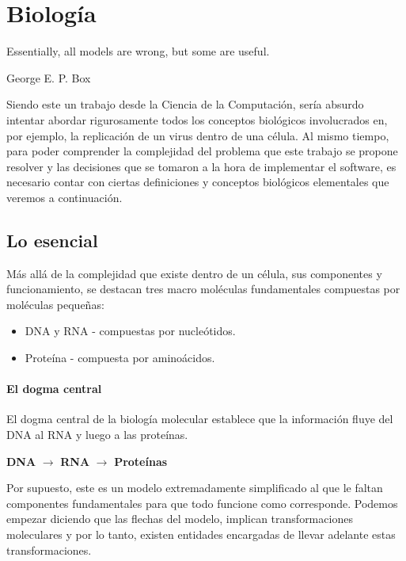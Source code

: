 \chapter{Biolog\'ia}
\label{biologia}
\epigraph{Essentially, all models are wrong, but some are useful.}%
{George E. P. Box}

Siendo este un trabajo desde la Ciencia de la Computaci\'on, ser\'ia absurdo
intentar abordar rigurosamente todos los conceptos biol\'ogicos involucrados
en, por ejemplo, la replicaci\'on de un virus dentro de una c\'elula. Al mismo
tiempo, para poder comprender la complejidad del problema que este trabajo se
propone resolver y las decisiones que se tomaron a la hora de implementar el
software, es necesario contar con ciertas definiciones y conceptos biol\'ogicos
elementales que veremos a continuaci\'on.

\section{Lo esencial}
\label{bio-esencial}

M\'as all\'a de la complejidad que existe dentro de un c\'elula, sus componentes
y funcionamiento, se destacan tres macro mol\'eculas fundamentales compuestas
por mol\'eculas peque\~nas:
\begin{itemize}
 \item \ac{DNA} y \ac{RNA} - compuestas por nucle\'otidos. 
 \item Prote\'ina - compuesta por amino\'acidos.
\end{itemize}

\subsubsection{El dogma central}

El dogma central de la biolog\'ia molecular establece que la informaci\'on
fluye del \ac{DNA} al \ac{RNA} y luego a las prote\'inas.
\begin{center}
 \textbf{DNA} $\longrightarrow$ \textbf{RNA} $\longrightarrow$
\textbf{Prote\'inas}
\end{center}

Por supuesto, este es un modelo extremadamente simplificado al que le faltan
componentes fundamentales para que todo funcione como corresponde. Podemos
empezar diciendo que las flechas del modelo, implican transformaciones
moleculares y por lo tanto, existen entidades encargadas de llevar adelante
estas transformaciones. 


